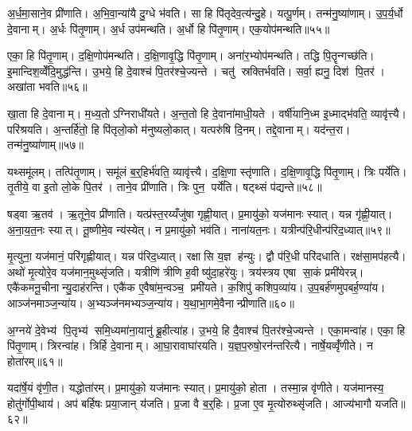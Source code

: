 अ॒र्ध॒मा॒साने॒व प्री॑णाति। अ॒भि॒वा॒न्या॑यै दु॒ग्धे भ॑वति। सा हि पि॑तृदेव॒त्य॑न्दु॒हे। यत्पू॒र्णम्। तन्म॑नु॒ष्या॑णाम्। उ॒प॒र्य॒र्धो दे॒वानाम्। अ॒र्धः पि॑तृ॒णाम्। अ॒र्ध उप॑मन्थति। अ॒र्धो हि पि॑तृ॒णाम्। एक॒योप॑मन्थति॥५५॥

एका॒ हि पि॑तृ॒णाम्। द॒क्षि॒णोप॑मन्थति। द॒क्षि॒णावृ॒द्धि पि॑तृ॒णाम्। अना॑र॒भ्योप॑मन्थति। तद्धि पि॒तॄन्गच्छ॑ति। इ॒मान्दिश॒व्वेँदि॒मुद्ध॑न्ति। उ॒भये॒ हि दे॒वाश्च॑ पि॒तर॑श्चे॒ज्यन्ते। चतु॑ स्रक्तिर्भवति। सर्वा॒ ह्यनु॒ दिश॑ पि॒तर॑। अखा॑ता भवति॥५६॥

खा॒ता हि दे॒वानाम्। म॒ध्य॒तोऽग्निराधी॑यते। अ॒न्त॒तो हि दे॒वाना॑माधी॒यते। वर्\mbox{}षी॑यानि॒ध्म इ॒ध्माद्भ॑वति॒ व्यावृ॑त्त्यै। परि॑श्रयति। अ॒न्तर्\mbox{}हि॑तो॒ हि पि॑तृलो॒को म॑नुष्यलो॒कात्। यत्परु॑षि दि॒नम्। तद्दे॒वानाम्। यद॑न्त॒रा। तन्म॑नु॒ष्या॑णाम्॥५७॥

यथ्समू॑लम्। तत्पि॑तृ॒णाम्। समू॑लं ब॒र्॒हिर्भ॑वति॒ व्यावृ॑त्त्यै। द॒क्षि॒णा स्तृ॑णाति। द॒क्षि॒णावृ॒द्धि पि॑तृ॒णाम्। त्रिः पर्ये॑ति। तृ॒तीये॒ वा इ॒तो लो॒के पि॒तर॑। ताने॒व प्री॑णाति। त्रिः पुन॒ पर्ये॑ति। षट्थ्सं प॑द्यन्ते॥५८॥

षड्वा ऋ॒तव॑। ऋ॒तूने॒व प्री॑णाति। यत्प्र॑स्त॒रय्यँजु॑षा गृह्णी॒यात्। प्र॒मायु॑को॒ यज॑मानः स्यात्। यन्न गृ॑ह्णी॒यात्। अ॒ना॒य॒त॒नः स्यात्। तू॒ष्णीमे॒व न्य॑स्येत्। न प्र॒मायु॑को॒ भव॑ति। नाना॑यत॒नः। यत्रीन्प॑रि॒धीन्प॑रिद॒ध्यात्॥५९॥

मृ॒त्युना॒ यज॑मानं॒ परि॑गृह्णीयात्। यन्न प॑रिद॒ध्यात्। रक्षासि य॒ज्ञ ह॑न्युः। द्वौ प॑रि॒धी परि॑दधाति। रक्ष॑सा॒मप॑हत्यै। अथो॑ मृ॒त्योरे॒व यज॑मान॒मुथ्सृ॑जति। यत्रीणि॑ त्रीणि ह॒वीष्यु॑दा॒हरे॑युः। त्रय॑स्त्रय एषा सा॒कं प्रमी॑येरन्न्। एकै॑कमनू॒चीनान्यु॒दाह॑रन्ति। एकै॑क ए॒वैषा॑म॒न्वञ्च॒ प्रमी॑यते। क॒शिपु॑ कशिप॒व्या॑य। उ॒प॒बर्\mbox{}ह॑णमुपबर्\mbox{}ह॒ण्या॑य। आञ्ज॑नमाञ्ज॒न्या॑य। अ॒भ्यञ्ज॑नमभ्यञ्ज॒न्या॑य। य॒था॒भा॒गमे॒वैनान्प्रीणाति॥६०॥

अ॒ग्नये॑ दे॒वेभ्य॑ पि॒तृभ्य॑ समि॒ध्यमा॑ना॒यानु॑ ब्रू॒हीत्या॑ह। उ॒भये॒ हि दै॒वाश्च॑ पि॒तर॑श्चे॒ज्यन्ते। एका॒मन्वा॑ह। एका॒ हि पि॑तृ॒णाम्। त्रिरन्वा॑ह। त्रिर्\mbox{}हि दे॒वानाम्। आ॒घा॒रावाघा॑रयति। य॒ज्ञ॒प॒रुषो॒रन॑न्तरित्यै। नार्\mbox{}षे॒यव्वृँ॑णीते। न होता॑रम्॥६१॥

यदा॑र्\mbox{}षे॒यं वृ॑णी॒त। यद्धोता॑रम्। प्र॒मायु॑को॒ यज॑मानः स्यात्। प्र॒मायु॑को॒ होता। तस्मा॒न्न वृ॑णीते। यज॑मानस्य॒ होतु॑र्गोपी॒थाय॑। अप॑ बर्\mbox{}हिषः प्रया॒जान् य॑जति। प्र॒जा वै ब॒र्॒हिः। प्र॒जा ए॒व मृ॒त्योरुथ्सृ॑जति। आज्य॑भागौ यजति॥६२॥

